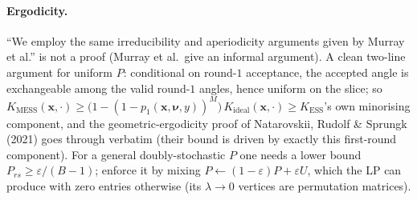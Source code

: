 \documentclass[11pt,a4paper]{article}
\theoremstyle{remark}
\newcommand{\bx}{\bm{x}}
\newcommand{\bnu}{\bm{\nu}}
\begin{document}
\paragraph{Ergodicity.} ``We employ the same irreducibility and aperiodicity arguments given by Murray et al.'' is not a proof (Murray et al.\ give an informal argument). A clean two-line argument for uniform $P$: conditional on round-$1$ acceptance, the accepted angle is exchangeable among the valid round-$1$ angles, hence uniform on the slice; so $K_{\mathrm{MESS}}(\bx,\cdot)\ge\big(1-(1-p_1(\bx,\bnu,y))^M\big)\,K_{\mathrm{ideal}}(\bx,\cdot)\ge K_{\mathrm{ESS}}$'s own minorising component, and the geometric-ergodicity proof of Natarovskii, Rudolf \& Sprungk (2021) goes through verbatim (their bound is driven by exactly this first-round component). For a general doubly-stochastic $P$ one needs a lower bound $P_{rs}\ge\varepsilon/(B-1)$; enforce it by mixing $P\leftarrow(1-\varepsilon)P+\varepsilon U$, which the LP can produce with zero entries otherwise (its $\lambda\to0$ vertices are permutation matrices).
\end{document}
